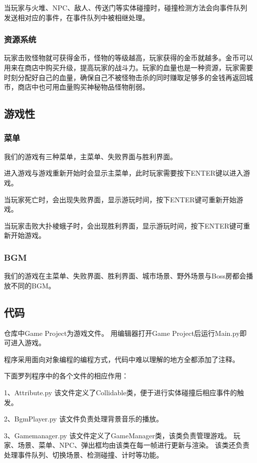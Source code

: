 \documentclass{ctexart}
\begin{document}
当玩家与火堆、NPC、敌人、传送门等实体碰撞时，碰撞检测方法会向事件队列发送相对应的事件，在事件队列中被相继处理。

\subsubsection{资源系统}
玩家击败怪物就可获得金币，怪物的等级越高，玩家获得的金币就越多。金币可以用来在商店中购买升级，提高玩家的战斗力。玩家的血量也是一种资源，玩家需要时刻分配好自己的血量，确保自己不被怪物击杀的同时赚取足够多的金钱再返回城市，商店中也可用血量购买神秘物品怪物削弱。

\subsection{游戏性}
\subsubsection{菜单}
我们的游戏有三种菜单，主菜单、失败界面与胜利界面。

进入游戏与游戏重新开始时会显示主菜单，此时玩家需要按下ENTER键以进入游戏。

当玩家死亡时，会出现失败界面，显示游玩时间，按下ENTER键可重新开始游戏。

当玩家击败大扑棱蛾子时，会出现胜利界面，显示游玩时间，按下ENTER键可重新开始游戏。

\subsubsection{BGM}
我们的游戏在主菜单、失败界面、胜利界面、城市场景、野外场景与Boss房都会播放不同的BGM。

\subsection{代码}
仓库中Game Project为游戏文件。
用编辑器打开Game Project后运行Main.py即可进入游戏。

程序采用面向对象编程的编程方式，代码中难以理解的地方全都添加了注释。

下面罗列程序中的各个文件的相应作用：

    1、Attribute.py
      该文件定义了Collidable类，便于进行实体碰撞后相应事件的触发。

    2、BgmPlayer.py
      该文件负责处理背景音乐的播放。

    3、Gamemanager.py
      该文件定义了GameManager类，该类负责管理游戏。
      玩家、场景、菜单、NPC、弹出框均由该类在每一帧进行更新与渲染。
      该类还负责处理事件队列、切换场景、检测碰撞、计时等功能。
\end{document}
